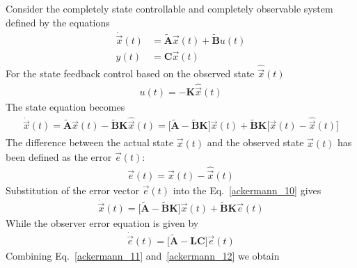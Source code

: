 \documentclass[11pt,a4paper,oneside]{book}
\numberwithin{equation}{section}
\theoremstyle{it}
\theoremstyle{definition}
\begin{document}
Consider the completely state controllable and completely observable system 
defined by the equations
\begin{equation*}
	\begin{split}
		\dot{\vec x}(t) & = \tilde{\mathbf{A}}\vec x(t) + 
		\tilde{\mathbf{B}}u(t) \\
		y(t) & = \mathbf{C}\vec x(t)
	\end{split}
\end{equation*} 
For the state feedback control based on the observed state $\hat{\vec x}(t)$ 
\begin{equation*}
	\begin{split}
		u(t)=-\mathbf{K}\hat{\vec x}(t)
	\end{split}
\end{equation*} 
The state equation becomes
\begin{equation} \label{ackermann_10}
	\begin{split}
		\dot{\vec x}(t)=\tilde{\mathbf{A}}\vec 
		x(t)-\tilde{\mathbf{B}}\mathbf{K}\hat{\vec x}(t) = 
		\Big[\tilde{\mathbf{A}}-\tilde{\mathbf{B}}\mathbf{K}\Big]\vec x(t) + 
		\tilde{\mathbf{B}}\mathbf{K}\Big[\vec x(t) - 
		\hat{\vec x}(t)\Big]
	\end{split}
\end{equation} 
The difference between the actual state $\vec x(t)$ and the observed state $\hat{\vec x}(t)$ has been defined as the error $\vec e(t)$:
\begin{equation*}
	\begin{split}
		\vec e(t)=\vec x(t) - \hat{\vec x}(t)
	\end{split}
\end{equation*} 
Substitution of the error vector $\vec e(t)$ into the Eq.~\eqref{ackermann_10} 
gives
\begin{equation} \label{ackermann_11}
	\begin{split}
		\dot{\vec x}(t) = 
		\Big[\tilde{\mathbf{A}}-\tilde{\mathbf{B}}\mathbf{K}\Big]\vec x(t) + 
		\tilde{\mathbf{B}}\mathbf{K}\vec{e}(t)
	\end{split}
\end{equation} 
While the observer error equation is given by
\begin{equation} \label{ackermann_12}
	\begin{split}
		\dot{\vec e}(t)= \Big[\tilde{\mathbf{A}}-\mathbf{LC}\Big]\vec e(t)
	\end{split}
\end{equation}
Combining Eq.~\eqref{ackermann_11} and~\eqref{ackermann_12} we obtain
\end{document}
